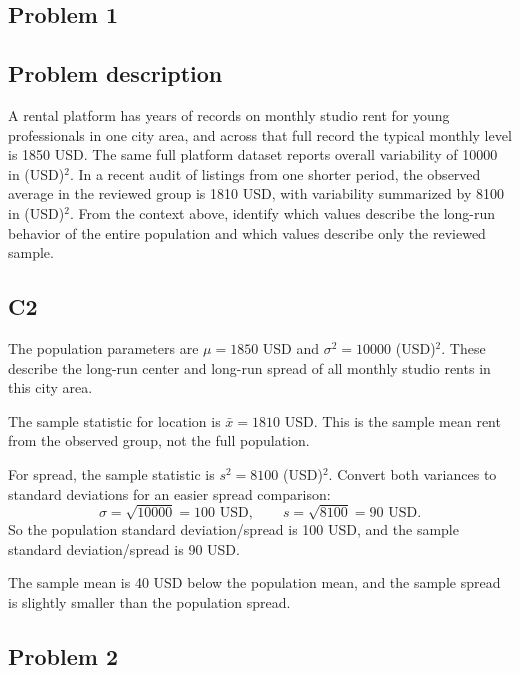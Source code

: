 


	\begin{ExamProblems}
		\item
		\subsection*{Problem 1}
		\subsection*{Problem description}
		A rental platform has years of records on monthly studio rent for young professionals in one city area, and across that full record the typical monthly level is 1850 USD.
		The same full platform dataset reports overall variability of 10000 in (USD)$^2$.
		In a recent audit of listings from one shorter period, the observed average in the reviewed group is 1810 USD, with variability summarized by 8100 in (USD)$^2$.
		From the context above, identify which values describe the long-run behavior of the entire population and which values describe only the reviewed sample.

\subsection*{C2}
		The population parameters are $\mu = 1850$ USD and $\sigma^2 = 10000$ (USD)$^2$.
		These describe the long-run center and long-run spread of all monthly studio rents in this city area.

		The sample statistic for location is $\bar{x} = 1810$ USD.
		This is the sample mean rent from the observed group, not the full population.

		For spread, the sample statistic is $s^2 = 8100$ (USD)$^2$.
		Convert both variances to standard deviations for an easier spread comparison:
		\[
		\sigma = \sqrt{10000} = 100 \text{ USD},
		\qquad
		s = \sqrt{8100} = 90 \text{ USD}.
		\]
		So the population standard deviation/spread is 100 USD, and the sample standard deviation/spread is 90 USD.

		The sample mean is 40 USD below the population mean, and the sample spread is slightly smaller than the population spread.

		\newpage
		\item
		\subsection*{Problem 2}

\end{ExamProblems}
